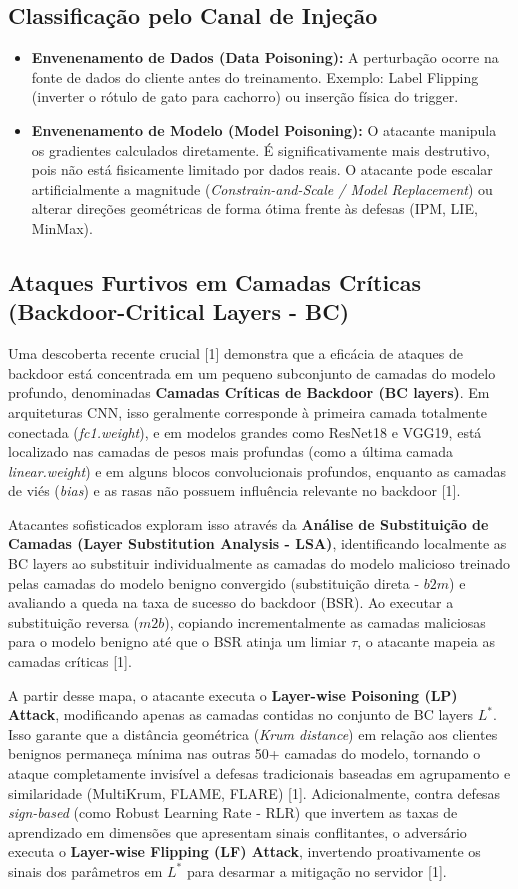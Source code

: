 \documentclass[11pt,a4paper]{article}
\begin{document}
\subsection{Classificação pelo Canal de Injeção}
\begin{itemize}
\item \textbf{Envenenamento de Dados (Data Poisoning):} A perturbação ocorre na fonte de dados do cliente antes do treinamento. Exemplo: Label Flipping (inverter o rótulo de gato para cachorro) ou inserção física do trigger.
\item \textbf{Envenenamento de Modelo (Model Poisoning):} O atacante manipula os gradientes calculados diretamente. É significativamente mais destrutivo, pois não está fisicamente limitado por dados reais. O atacante pode escalar artificialmente a magnitude (\textit{Constrain-and-Scale / Model Replacement}) ou alterar direções geométricas de forma ótima frente às defesas (IPM, LIE, MinMax).
\end{itemize}

\subsection{Ataques Furtivos em Camadas Críticas (Backdoor-Critical Layers - BC)}
Uma descoberta recente crucial [1] demonstra que a eficácia de ataques de backdoor está concentrada em um pequeno subconjunto de camadas do modelo profundo, denominadas \textbf{Camadas Críticas de Backdoor (BC layers)}. Em arquiteturas CNN, isso geralmente corresponde à primeira camada totalmente conectada (\textit{fc1.weight}), e em modelos grandes como ResNet18 e VGG19, está localizado nas camadas de pesos mais profundas (como a última camada \textit{linear.weight}) e em alguns blocos convolucionais profundos, enquanto as camadas de viés (\textit{bias}) e as rasas não possuem influência relevante no backdoor [1].

Atacantes sofisticados exploram isso através da \textbf{Análise de Substituição de Camadas (Layer Substitution Analysis - LSA)}, identificando localmente as BC layers ao substituir individualmente as camadas do modelo malicioso treinado pelas camadas do modelo benigno convergido (substituição direta - $b2m$) e avaliando a queda na taxa de sucesso do backdoor (BSR). Ao executar a substituição reversa ($m2b$), copiando incrementalmente as camadas maliciosas para o modelo benigno até que o BSR atinja um limiar $\tau$, o atacante mapeia as camadas críticas [1].

A partir desse mapa, o atacante executa o \textbf{Layer-wise Poisoning (LP) Attack}, modificando apenas as camadas contidas no conjunto de BC layers $L^*$. Isso garante que a distância geométrica (\textit{Krum distance}) em relação aos clientes benignos permaneça mínima nas outras 50+ camadas do modelo, tornando o ataque completamente invisível a defesas tradicionais baseadas em agrupamento e similaridade (MultiKrum, FLAME, FLARE) [1]. Adicionalmente, contra defesas \textit{sign-based} (como Robust Learning Rate - RLR) que invertem as taxas de aprendizado em dimensões que apresentam sinais conflitantes, o adversário executa o \textbf{Layer-wise Flipping (LF) Attack}, invertendo proativamente os sinais dos parâmetros em $L^*$ para desarmar a mitigação no servidor [1].
\end{document}

